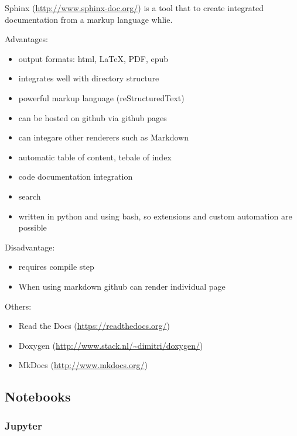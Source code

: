 Sphinx (\url{http://www.sphinx-doc.org/}) is a tool that to create
integrated documentation from a markup language whlie.

Advantages:

\begin{itemize}

\item
  output formats: html, LaTeX, PDF, epub
\item
  integrates well with directory structure
\item
  powerful markup language (reStructuredText)
\item
  can be hosted on github via github pages
\item
  can integare other renderers such as Markdown
\item
  automatic table of content, tebale of index
\item
  code documentation integration
\item
  search
\item
  written in python and using bash, so extensions and custom automation
  are possible
\end{itemize}

Disadvantage:

\begin{itemize}

\item
  requires compile step
\item
  When using markdown github can render individual page
\end{itemize}

Others:

\begin{itemize}

\item
  Read the Docs (\url{https://readthedocs.org/})
\item
  Doxygen (\url{http://www.stack.nl/~dimitri/doxygen/})
\item
  MkDocs (\url{http://www.mkdocs.org/})
\end{itemize}

\subsection{Notebooks}\label{notebooks}

\subsubsection{Jupyter}\label{jupyter}

